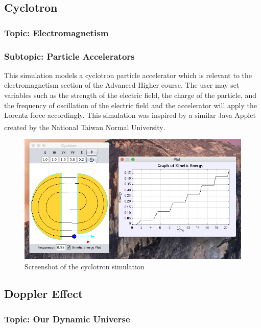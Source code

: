 \documentclass[11pt]{article}
\begin{document}
\newpage
\subsection*{Cyclotron}
\subsubsection*{Topic: Electromagnetism}
\subsubsection*{Subtopic: Particle Accelerators}
This simulation models a cyclotron particle accelerator which is
relevant to the electromagnetism section of the Advanced Higher
course. The user may set variables such as the strength of the
electric field, the charge of the particle, and the frequency of
oscillation of the electric field and the accelerator will apply the
Lorentz force accordingly. This simulation was inspired by a similar
Java Applet created by the National Taiwan Normal University\textsuperscript{\cite{cyclotron}}.
\begin{figure}[H]
\centering
\includegraphics[width=.9\linewidth]{./cycloUI.png}
\caption{Screenshot of the cyclotron simulation}
\end{figure}

\subsection*{Doppler Effect}
\subsubsection*{Topic: Our Dynamic Universe}
\end{document}
